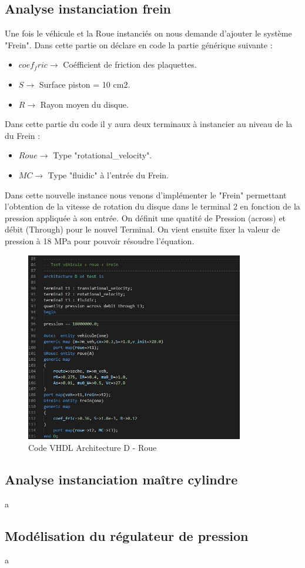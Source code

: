 \subsection{Analyse instanciation frein}
Une fois le véhicule et la Roue instanciés on nous demande d'ajouter le système "Frein". Dans cette partie on déclare en code la partie générique suivante :\\
\begin{itemize}
    \item $coef_fric    \rightarrow$ Coéfficient de friction des plaquettes.
    \item $S    \rightarrow$ Surface piston = 10 cm2.
    \item $R   \rightarrow$ Rayon moyen du disque.
\end{itemize}

Dans cette partie du code il y aura deux terminaux à instancier au niveau de la du Frein :

\begin{itemize}
    \item $Roue    \rightarrow$ Type "rotational\_velocity".
    \item $MC    \rightarrow$ Type "fluidic" à l'entrée du Frein.
\end{itemize}

Dans cette nouvelle instance nous venons d'implémenter le "Frein" permettant l'obtention de la vitesse de rotation du disque dans le terminal 2 en fonction de la pression appliquée à son entrée. On définit une quatité de Pression (across) et débit (Through) pour le nouvel Terminal. On vient ensuite fixer la valeur de pression à 18 MPa pour pouvoir résoudre l'équation.

\newpage

\begin{figure}[h]
    \centering
    \includegraphics[width=0.85\textwidth]{images/Instanciation_frein.jpg}
    \caption{Code VHDL Architecture D - Roue}
\end{figure}


\newpage

\subsection{Analyse instanciation maître cylindre}
a
\subsection{Modélisation du régulateur de pression}
a
\newpage